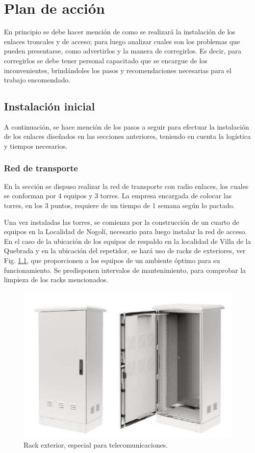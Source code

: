 \documentclass[12pt,a4paper]{book}
\begin{document}
\chapter{Plan de acción}

En principio se debe hacer mención de como se realizará la instalación de los enlaces troncales y de acceso; para luego analizar cuales son los problemas que pueden presentarse, como advertirlos y la manera de corregirlos. Es decir, para corregirlos se debe tener personal capacitado que se encargue de los inconvenientes, brindándoles los pasos y recomendaciones necesarias para el trabajo encomendado.


\section{Instalación inicial}

A continuación, se hace mención de los pasos a seguir para efectuar la instalación de los enlaces diseñados en las secciones anteriores, teniendo en cuenta la logística y tiempos necesarios.

\subsection{Red de transporte}
En la sección %
se dispuso realizar la red de transporte con radio enlaces, los cuales se conforman por 4 equipos y 3 torres. La empresa encargada de colocar las torres, en los 3 puntos, requiere de un tiempo de 1 semana según lo pactado.

\medskip

Una vez instaladas las torres, se comienza por la construcción de un cuarto de equipos en la Localidad de Nogolí, necesario para luego instalar la red de acceso. En el caso de la ubicación de los equipos de respaldo en la localidad de Villa de la Quebrada y en la ubicación del repetidor, se hará uso de racks de exteriores, ver Fig. \ref{fig_rack_ext_plan}, que proporcionen a los equipos de un ambiente óptimo para su funcionamiento. Se predisponen intervalos de mantenimiento, para comprobar la limpieza de los racks mencionados.

\begin{figure} [H]
\centering
\includegraphics[width= 8 cm]{../figuras/rack_exterior.jpg}
\caption{Rack exterior, especial para telecomunicaciones.}
\label{fig_rack_ext_plan}
\end{figure}
\end{document}
